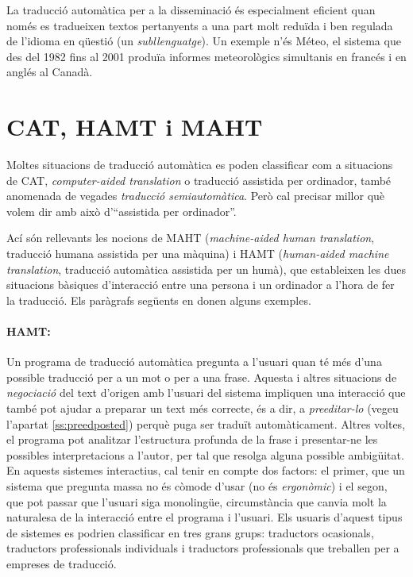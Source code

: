 La traducció automàtica per a la disseminació és especialment eficient
quan només es tradueixen textos pertanyents a una part molt reduïda i
ben regulada de l'idioma en qüestió (un \emph{subllenguatge}).  Un
exemple n'és Méteo, el sistema que des del 1982 fins al 2001 produïa
informes meteorològics simultanis en francés i en anglés al Canadà.


\section{CAT, HAMT i MAHT} 
\label{se:cat}

Moltes situacions de traducció automàtica es poden classificar com a
situacions de CAT, {\em computer-aided translation} o traducció
assistida per ordinador, també anomenada de vegades \emph{traducció
  semiautomàtica}. Però cal precisar millor què volem dir amb això
d'``assistida per ordinador''. 

Ací són rellevants les nocions de MAHT
(\emph{machine-aided human translation}, traducció humana assistida
per una màquina) i HAMT (\emph{human-aided machine translation},
traducció automàtica assistida per un humà), que estableixen les dues
situacions bàsiques d'interacció entre una persona i un ordinador a
l'hora de fer la traducció. Els paràgrafs següents en donen alguns
exemples.

\paragraph{HAMT:} Un programa de traducció automàtica pregunta a
l'usuari quan té més d'una possible traducció per a un mot o per a una
frase.  Aquesta i altres situacions de \emph{negociació} del text
d'origen amb l'usuari del sistema impliquen una interacció que també
pot ajudar a preparar un text més correcte, és a dir, a
\emph{preeditar-lo} (vegeu l'apartat \ref{ss:preedposted}) perquè puga
ser traduït automàticament. Altres voltes, el programa pot analitzar
l'estructura profunda de la frase i presentar-ne les possibles
interpretacions a l'autor, per tal que resolga alguna possible
ambigüitat. En aquests sistemes interactius, cal tenir en compte dos
factors: el primer, que un sistema que pregunta massa no és còmode
d'usar (no és \emph{ergonòmic}) i el segon, que pot passar que
l'usuari siga monolingüe, circumstància que canvia molt la naturalesa
de la interacció entre el programa i l'usuari.  Els usuaris d'aquest
tipus de sistemes es podrien classificar en tres grans grups:
traductors ocasionals, traductors professionals individuals i
traductors professionals que treballen per a empreses de traducció.

